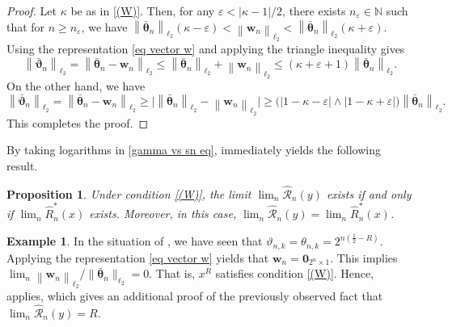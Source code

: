 \documentclass[12pt,reqno]{article}
\newcommand{\norm}[1]{\left\lVert {#1}\right\rVert}
\def\wh{\widehat}
\numberwithin{equation}{section}
\def\cR{{\mathscr R}}
\def\cH{{\mathscr H}}
\newtheorem{proposition}[theorem]{Proposition}
\theoremstyle{definition}
\newtheorem{example}[theorem]{Example}
\def\wh{\widehat}
\newcommand{\bN}{\mathbb{N}}
\begin{document}
\begin{proof} Let $\kappa$ be as in  \eqref{(W)}. Then, for any $\varepsilon < |\kappa - 1|/2$, there exists $n_\varepsilon \in \bN$ such that for $n \ge n_\varepsilon$, we have  $\norm{\bar{\bm\theta}_{n}}_{\ell_2}(\kappa - \varepsilon) < \norm{\bm w_n}_{\ell_2} < \norm{\bar{\bm\theta}_{n}}_{\ell_2}(\kappa + \varepsilon)$. Using the representation \eqref{eq vector w} and applying the triangle inequality gives
	\begin{equation*}
	 \norm{\bar{\bm \vartheta}_n}_{\ell_2} = \norm{\bar{\bm \theta}_n - \bm w_n}_{\ell_2}  \le \norm{\bar{\bm\theta}_{n}}_{\ell_2} + \norm{\bm w_{n}}_{\ell_2} \le (\kappa + \varepsilon + 1) \norm{\bar{\bm\theta}_{n}}_{\ell_2}.
	\end{equation*}
	On the other hand, we have 
	\begin{equation*}
	 \norm{\bar{\bm \vartheta}_n}_{\ell_2} = \norm{\bar{\bm \theta}_n - \bm w_n}_{\ell_2}  \ge \Big|\norm{\bar{\bm\theta}_{n}}_{\ell_2} - \norm{\bm w_{n}}_{\ell_2}\Big| \ge \big(|1 - \kappa - \varepsilon| \wedge |1 - \kappa + \varepsilon|\big) \norm{\bar{\bm\theta}_{n}}_{\ell_2}.
	\end{equation*}
	This completes the proof.
\end{proof}

By taking logarithms in \eqref{gamma vs sn eq},  immediately yields the following result.


\begin{proposition}\label{prop model free} Under condition \eqref{(W)}, the  limit $ \lim_{n}\wh\cR_n(y)$ exists if and only if  $ \lim_{n}\wh R^*_n(x)$ exists. Moreover, in this case, $\lim_{n}\wh\cR_n(y) = \lim_{n}\wh R^*_n(x)$.
	\end{proposition}

\begin{example}\label{Takagi example 2} In the situation of , we have seen that $
	\vartheta_{n,k} = \theta_{n,k} = 2^{n(\frac{1}{2}-{R})}
	$. Applying the representation \eqref{eq vector w}  yields that $\bm w_n = \bm 0_{2^{n} \times 1}$. This implies
	$
	\lim_{n}\norm{\bm w_n}_{\ell_2}/\|\bar{\bm \theta}_n\|_{\ell_2} = 0
	$. That is, $x^{R}$ satisfies condition \eqref{(W)}.
	Hence,   applies, which gives an additional proof of the previously observed fact that $\lim_n\wh\cR_n(y)= {R}$.\end{example}
\end{document}
